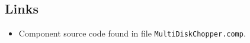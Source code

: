 \subsection*{Links}
\begin{itemize}
  \item Component source code found in file \texttt{MultiDiskChopper.comp}.
\end{itemize}
